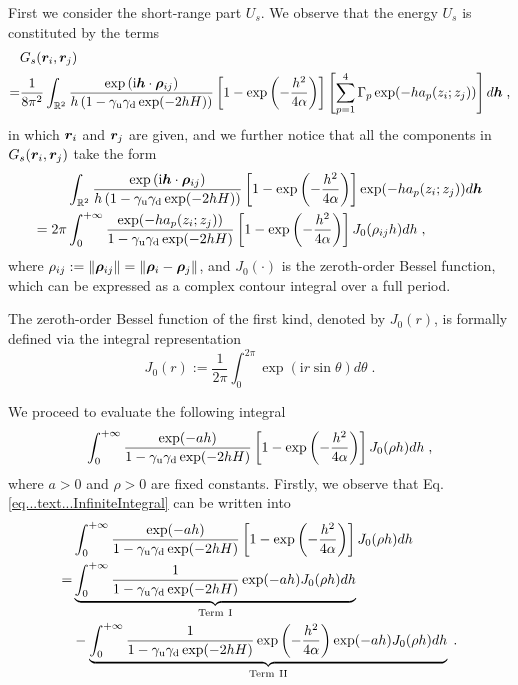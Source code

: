 First we consider the short-range part $U_s$.
We observe that the energy $U_s$ is constituted by the terms
\begin{align*}
  &G_s(\boldsymbol{r}_i, \boldsymbol{r}_j)\\
   =& \frac{1}{8\pi^2 }\int_{\mathbb{R}^2} \frac{ \exp{(\mathrm{i} \boldsymbol{h} \cdot \boldsymbol{\rho}_{ij})}}{h \left(1-\gamma_{\mathrm{u}}\gamma_{\mathrm{d}}\exp(-2hH)\right)} \left[1-\exp\left(-\frac{h^2}{4\alpha}\right)\right]\left[\sum_{p=1}^4\Gamma_p\exp(-ha_p(z_i;z_j))\right]d \boldsymbol{h}\;,  
\end{align*}
in which $\bm{r}_i$ and $\bm{r}_j$ are given, and we further notice  that all the components in $G_s(\boldsymbol{r}_i, \boldsymbol{r}_j)$ take the form
\begin{equation}\label{eq::int_Gs}
    \begin{split}
        & \int_{\mathbb{R}^2} \frac{ \exp{(\mathrm{i} \boldsymbol{h} \cdot \boldsymbol{\rho}_{ij})}}{h \left(1-\gamma_{\mathrm{u}}\gamma_{\mathrm{d}}\exp(-2hH)\right)} \left[1-\exp\left(-\frac{h^2}{4\alpha}\right)\right]\exp(-ha_p(z_i;z_j))d \boldsymbol{h}\\
        =2\pi&\int_0^{+\infty} \frac{ \exp(-ha_p(z_i;z_j))}{1-\gamma_{\mathrm{u}}\gamma_{\mathrm{d}}\exp(-2hH)} \left[1-\exp\left(-\frac{h^2}{4\alpha}\right)\right] J_0(\rho_{ij} h)d h\;,
    \end{split}
\end{equation}
where $\rho_{ij}:=\left\lVert\bm{\rho}_{ij}\right\rVert=\left\lVert\bm{\rho}_i-\bm{\rho}_j\right\rVert$, and $ J_0(\cdot)$ is the zeroth-order Bessel function,  which can be expressed as a complex contour integral over a full period.
\begin{defn}
    The zeroth-order Bessel function of the first kind, denoted by $ J_0(r)$, is formally defined via the integral representation
\begin{equation}
       J_0(r):=\frac{1}{2\pi} \int_0^{2\pi} \exp(\mathrm{i} r\sin \theta) d \theta\;.  
    \end{equation}
\end{defn}
We proceed to evaluate the following integral
\begin{equation}\label{eq...text...InfiniteIntegral}
\int_0^{+\infty} \frac{ \exp(-ah)}{1-\gamma_{\mathrm{u}}\gamma_{\mathrm{d}}\exp(-2hH)} \left[1-\exp\left(-\frac{h^2}{4\alpha}\right)\right] J_0(\rho h)d h\;,    
\end{equation}
where $a>0$ and $\rho>0$ are fixed constants. Firstly, we observe that Eq. \eqref{eq...text...InfiniteIntegral} can be written into
\begin{align*}
   & \int_0^{+\infty} \frac{ \exp(-ah)}{1-\gamma_{\mathrm{u}}\gamma_{\mathrm{d}}\exp(-2hH)} \left[1-\exp\left(-\frac{h^2}{4\alpha}\right)\right] J_0(\rho h)d h\\
   =&\underbrace{\int_0^{+\infty} \frac{1}{1-\gamma_{\mathrm{u}}\gamma_{\mathrm{d}}\exp(-2hH)}  \exp(-ah)  J_0(\rho h)d h}_{\text{Term}~\mathrm{I}}\\
   &-\underbrace{\int_0^{+\infty} \frac{1}{1-\gamma_{\mathrm{u}}\gamma_{\mathrm{d}}\exp(-2hH)}\exp\left(-\frac{h^2}{4\alpha}\right)  \exp(-ah)  J_0(\rho h)d h}_{\text{Term}~\mathrm{II}}\;.
\end{align*}
